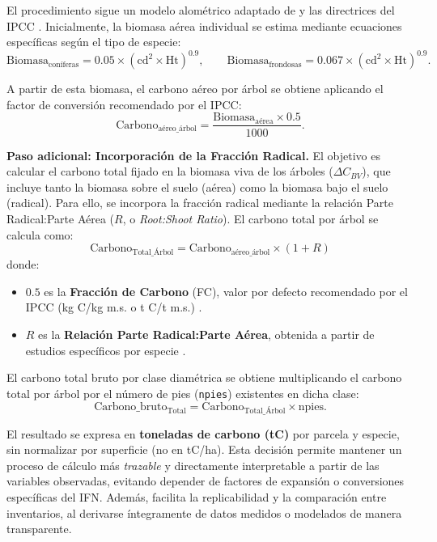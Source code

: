 \begin{itemize}
El procedimiento sigue un modelo alométrico adaptado de \cite{chave2014} y las directrices del IPCC \cite{ipcc2006}. 
Inicialmente, la biomasa aérea individual se estima mediante ecuaciones específicas según el tipo de especie:
\[
\text{Biomasa}_{\text{coníferas}} = 0.05 \times (\text{cd}^2 \times \text{Ht})^{0.9}, \qquad
\text{Biomasa}_{\text{frondosas}} = 0.067 \times (\text{cd}^2 \times \text{Ht})^{0.9}.
\]

A partir de esta biomasa, el carbono aéreo por árbol se obtiene aplicando el factor de conversión recomendado por el IPCC:
\[
\text{Carbono}_{\text{aéreo\_árbol}} = \frac{\text{Biomasa}_{\text{aérea}} \times 0.5}{1000}.
\]

\textbf{Paso adicional: Incorporación de la Fracción Radical.}  
El objetivo es calcular el carbono total fijado en la biomasa viva de los árboles ($\Delta C_{BV}$), que incluye tanto la biomasa sobre el suelo (aérea) como la biomasa bajo el suelo (radical).  
Para ello, se incorpora la fracción radical mediante la relación Parte Radical:Parte Aérea ($R$, o \textit{Root:Shoot Ratio}).  
El carbono total por árbol se calcula como:
\[
\text{Carbono}_{\text{Total\_Árbol}} = \text{Carbono}_{\text{aéreo\_árbol}} \times (1 + R)
\]
donde:
\begin{itemize}
    \item $0.5$ es la \textbf{Fracción de Carbono} (FC), valor por defecto recomendado por el IPCC (kg C/kg m.s. o t C/t m.s.) \cite{ipcc2006}.
    \item $R$ es la \textbf{Relación Parte Radical:Parte Aérea}, obtenida a partir de estudios específicos por especie \cite{ruizpeinado2011}.
\end{itemize}

El carbono total bruto por clase diamétrica se obtiene multiplicando el carbono total por árbol por el número de pies (\texttt{npies}) existentes en dicha clase:
\[
\text{Carbono\_bruto}_{\text{Total}} = \text{Carbono}_{\text{Total\_Árbol}} \times \text{npies}.
\]

El resultado se expresa en \textbf{toneladas de carbono (tC)} por parcela y especie, sin normalizar por superficie (no en tC/ha). 
Esta decisión permite mantener un proceso de cálculo más \textit{trazable} y directamente interpretable a partir de las variables observadas, evitando depender de factores de expansión o conversiones específicas del IFN. 
Además, facilita la replicabilidad y la comparación entre inventarios, al derivarse íntegramente de datos medidos o modelados de manera transparente.


\end{itemize}
